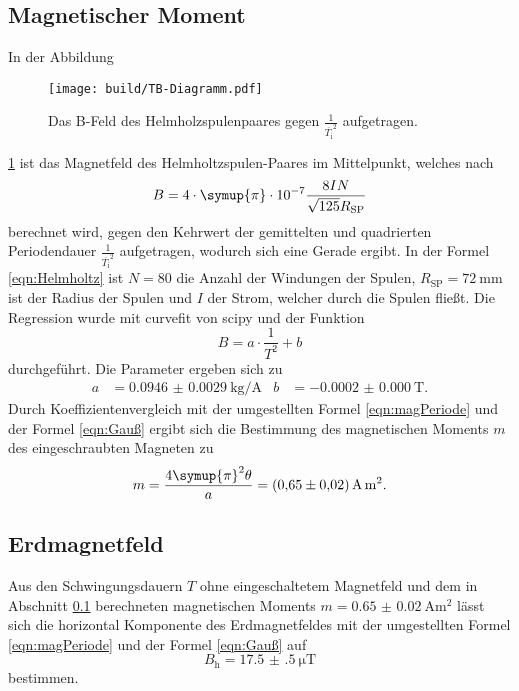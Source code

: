 \subsection{Magnetischer Moment}
\label{sec:MagnetischerMoment}
In der Abbildung
\begin{figure}
  \centering
  \texttt{[image: build/TB-Diagramm.pdf]}
  \caption{Das B-Feld des Helmholzspulenpaares gegen $\frac{1}{\overline{T_\text{i}}^2}$ aufgetragen. \cite{matplotlib}}
  \label{fig:Plot}
\end{figure}
\ref{fig:Plot} ist das Magnetfeld des Helmholtzspulen-Paares im Mittelpunkt,
welches nach
\begin{equation}
  B = 4 \cdot \symup{\pi} \cdot 10^{-7} \frac{8 I N}{\sqrt{125} R_\text{SP}}
  \label{eqn:Helmholtz}
\end{equation} berechnet wird,
gegen den Kehrwert der gemittelten und quadrierten Periodendauer
$\frac{1}{\overline{T_\text{i}}^2}$ aufgetragen, wodurch sich eine Gerade
ergibt. In der Formel \eqref{eqn:Helmholtz} ist $N = 80$ die Anzahl der Windungen
der Spulen, $R_\text{SP} = \SI{72}{\milli\meter}$ ist der Radius der Spulen und $I$ der Strom, welcher
durch die Spulen fließt.
Die Regression wurde mit curvefit von scipy \cite{scipy} und der Funktion
\begin{equation*}
  B = a \cdot \frac{1}{T^2} + b
\end{equation*}
durchgeführt. Die Parameter ergeben sich zu
\begin{align*}
  a & = \SI{0.0946(29)}{\kilo\gram\per\ampere} & b &= \SI{-0.0002(0)}{\tesla}.
\end{align*}
Durch Koeffizientenvergleich mit der umgestellten Formel \eqref{eqn:magPeriode}
und der Formel \eqref{eqn:Gauß} ergibt sich
die Bestimmung des magnetischen Moments $m$ des eingeschraubten Magneten zu
\begin{equation*}
  m = \frac{4 \symup{\pi}^2 \theta}{a} = \SI{0.65(2)}{\ampere\meter\squared}.
\end{equation*}




\FloatBarrier
\subsection{Erdmagnetfeld}
\label{sec:Erdmagnetfeld2}
Aus den Schwingungsdauern $T$ ohne eingeschaltetem Magnetfeld und dem in Abschnitt
\ref{sec:MagnetischerMoment} berechneten magnetischen Moments $m = \SI{0.65(2)}{\ampere\meter\squared}$
lässt sich die horizontal Komponente des Erdmagnetfeldes mit der umgestellten Formel
\eqref{eqn:magPeriode} und der Formel \eqref{eqn:Gauß} auf
\begin{equation*}
  B_\text{h} = \SI{17.5(5)}{\micro\tesla}
\end{equation*}
bestimmen.


